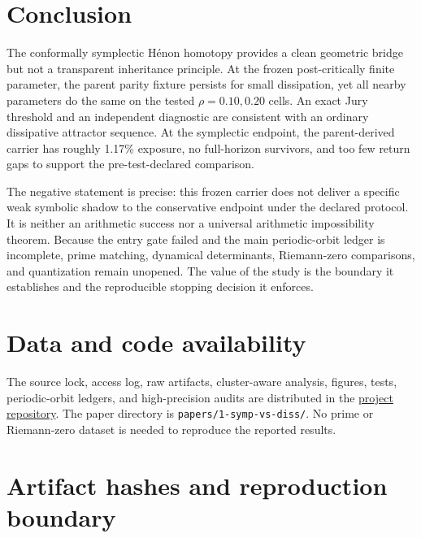 \documentclass[11pt]{article}
\begin{document}
\section{Conclusion}

The conformally symplectic H\'enon homotopy provides a clean geometric bridge
but not a transparent inheritance principle. At the frozen post-critically
finite parameter, the parent parity fixture persists for small dissipation,
yet all nearby parameters do the same on the tested \(\rho=0.10,0.20\)
cells. An exact Jury threshold and an independent diagnostic are consistent
with an ordinary dissipative attractor sequence.
At the symplectic endpoint, the parent-derived carrier has roughly 1.17\%
exposure, no full-horizon survivors, and too few return gaps to support the
pre-test-declared comparison.

The negative statement is precise: this frozen carrier does not deliver a
specific weak symbolic shadow to the conservative endpoint under the declared
protocol. It is neither an arithmetic success nor a universal arithmetic
impossibility theorem. Because the entry gate failed and the main
periodic-orbit ledger is incomplete, prime matching, dynamical determinants,
Riemann-zero comparisons, and quantization remain unopened. The value of the
study is the boundary it establishes and the reproducible stopping decision
it enforces.

\section*{Data and code availability}

The source lock, access log, raw artifacts, cluster-aware analysis, figures,
tests, periodic-orbit ledgers, and high-precision audits are distributed in
the \href{https://github.com/maris205/hilbert-polya-structure/tree/main/symplectic_map}
{project repository}.
The paper directory is \texttt{papers/1-symp-vs-diss/}. No prime or
Riemann-zero dataset is needed to reproduce the reported results.

\appendix

\section{Artifact hashes and reproduction boundary}
\label{app:repro}
\end{document}
